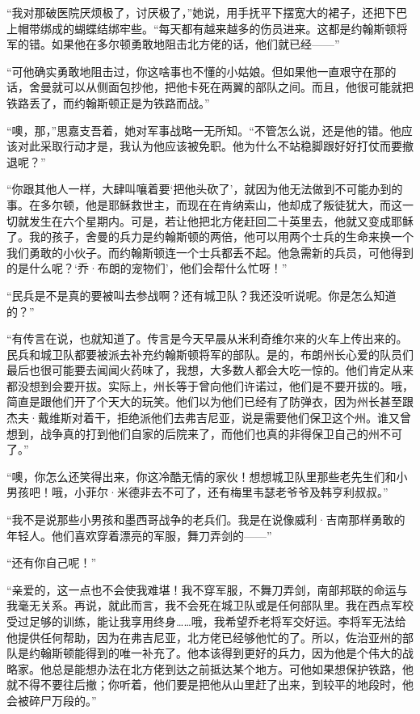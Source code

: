 \par “我对那破医院厌烦极了，讨厌极了，”她说，用手抚平下摆宽大的裙子，还把下巴上帽带绑成的蝴蝶结绑牢些。“每天都有越来越多的伤员进来。这都是约翰斯顿将军的错。如果他在多尔顿勇敢地阻击北方佬的话，他们就已经——”
\par “可他确实勇敢地阻击过，你这啥事也不懂的小姑娘。但如果他一直艰守在那的话，舍曼就可以从侧面包抄他，把他卡死在两翼的部队之间。而且，他很可能就把铁路丢了，而约翰斯顿正是为铁路而战。”
\par “噢，那，”思嘉支吾着，她对军事战略一无所知。“不管怎么说，还是他的错。他应该对此采取行动才是，我认为他应该被免职。他为什么不站稳脚跟好好打仗而要撤退呢？”
\par “你跟其他人一样，大肆叫嚷着要‘把他头砍了’，就因为他无法做到不可能办到的事。在多尔顿，他是耶稣救世主，而现在在肯纳索山，他却成了叛徒犹大，而这一切就发生在六个星期内。可是，若让他把北方佬赶回二十英里去，他就又变成耶稣了。我的孩子，舍曼的兵力是约翰斯顿的两倍，他可以用两个士兵的生命来换一个我们勇敢的小伙子。而约翰斯顿连一个士兵都丢不起。他急需新的兵员，可他得到的是什么呢？‘乔·布朗的宠物们’，他们会帮什么忙呀！”
\par “民兵是不是真的要被叫去参战啊？还有城卫队？我还没听说呢。你是怎么知道的？”
\par “有传言在说，也就知道了。传言是今天早晨从米利奇维尔来的火车上传出来的。民兵和城卫队都要被派去补充约翰斯顿将军的部队。是的，布朗州长心爱的队员们最后也很可能要去闻闻火药味了，我想，大多数人都会大吃一惊的。他们肯定从来都没想到会要开拔。实际上，州长等于曾向他们许诺过，他们是不要开拔的。哦，简直是跟他们开了个天大的玩笑。他们以为他们已经有了防弹衣，因为州长甚至跟杰夫·戴维斯对着干，拒绝派他们去弗吉尼亚，说是需要他们保卫这个州。谁又曾想到，战争真的打到他们自家的后院来了，而他们也真的非得保卫自己的州不可了。”
\par “噢，你怎么还笑得出来，你这冷酷无情的家伙！想想城卫队里那些老先生们和小男孩吧！哦，小菲尔·米德非去不可了，还有梅里韦瑟老爷爷及韩亨利叔叔。”
\par “我不是说那些小男孩和墨西哥战争的老兵们。我是在说像威利·吉南那样勇敢的年轻人。他们喜欢穿着漂亮的军服，舞刀弄剑的——”
\par “还有你自己呢！”
\par “亲爱的，这一点也不会使我难堪！我不穿军服，不舞刀弄剑，南部邦联的命运与我毫无关系。再说，就此而言，我不会死在城卫队或是任何部队里。我在西点军校受过足够的训练，能让我享用终身……哦，我希望乔老将军交好运。李将军无法给他提供任何帮助，因为在弗吉尼亚，北方佬已经够他忙的了。所以，佐治亚州的部队是约翰斯顿能得到的唯一补充了。他本该得到更好的兵力，因为他是个伟大的战略家。他总是能想办法在北方佬到达之前抵达某个地方。可他如果想保护铁路，他就不得不要往后撤；你听着，他们要是把他从山里赶了出来，到较平的地段时，他会被碎尸万段的。”
